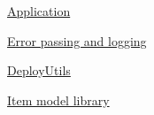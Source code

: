 \hyperlink{libs_Application}{Application}

\hyperlink{libs_Error}{Error passing and logging}

\hyperlink{libs_DeployUtils}{Deploy\+Utils}

\hyperlink{libs_ItemModel}{Item model library} 